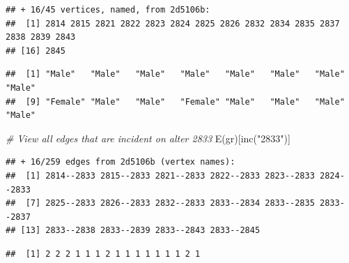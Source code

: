 \documentclass[
]{book}
\newenvironment{Shaded}{\begin{snugshade}}{\end{snugshade}}
\newcommand{\CommentTok}[1]{\textcolor[rgb]{0.56,0.35,0.01}{\textit{#1}}}
\newcommand{\FunctionTok}[1]{\textcolor[rgb]{0.00,0.00,0.00}{#1}}
\newcommand{\NormalTok}[1]{#1}
\newcommand{\SpecialCharTok}[1]{\textcolor[rgb]{0.00,0.00,0.00}{#1}}
\newcommand{\StringTok}[1]{\textcolor[rgb]{0.31,0.60,0.02}{#1}}
\begin{document}
\begin{verbatim}
## + 16/45 vertices, named, from 2d5106b:
##  [1] 2814 2815 2821 2822 2823 2824 2825 2826 2832 2834 2835 2837 2838 2839 2843
## [16] 2845
\end{verbatim}

\begin{Shaded}
\end{Shaded}

\begin{verbatim}
##  [1] "Male"   "Male"   "Male"   "Male"   "Male"   "Male"   "Male"   "Male"  
##  [9] "Female" "Male"   "Male"   "Female" "Male"   "Male"   "Male"   "Male"
\end{verbatim}

\begin{Shaded}
\begin{Highlighting}[]
\CommentTok{\# View all edges that are incident on alter 2833}
\FunctionTok{E}\NormalTok{(gr)[}\FunctionTok{inc}\NormalTok{(}\StringTok{"2833"}\NormalTok{)]}
\end{Highlighting}
\end{Shaded}

\begin{verbatim}
## + 16/259 edges from 2d5106b (vertex names):
##  [1] 2814--2833 2815--2833 2821--2833 2822--2833 2823--2833 2824--2833
##  [7] 2825--2833 2826--2833 2832--2833 2833--2834 2833--2835 2833--2837
## [13] 2833--2838 2833--2839 2833--2843 2833--2845
\end{verbatim}

\begin{Shaded}
\end{Shaded}

\begin{verbatim}
##  [1] 2 2 2 1 1 1 2 1 1 1 1 1 1 1 2 1
\end{verbatim}

\begin{Shaded}
\end{Shaded}
\end{document}
